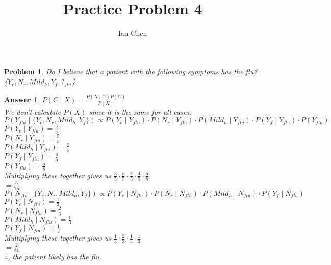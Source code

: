 \documentclass[11pt]{article}
\author{Ian Chen}
\title{Practice Problem 4}
\theoremstyle{description}
\newtheorem{problem}{Problem}
\theoremstyle{break}
\newtheorem*{answer}{Answer}
\begin{document}
    \maketitle

    \begin{problem}
        Do I believe that a patient with the following symptoms has the flu?\\
        \{$Y_c, N_r, Mild_h, Y_f, ?_{flu}$\}
    \end{problem}
    \begin{answer}
        $P(C\mid X) = \frac{P(X \mid C)P(C)}{P(X)}$\\
        We don't calculate $P(X)$ since it is the same for all cases.\\
        $P(Y_{flu} \mid \{Y_c, N_r, Mild_h, Y_f\}) \propto P(Y_c \mid Y_{flu})
        \cdot P(N_r \mid Y_{flu}) \cdot P(Mild_h \mid Y_{flu}) \cdot P(Y_f \mid Y_{flu})
        \cdot P(Y_{flu})$\\
        $P(Y_c \mid Y_{flu}) = \frac{3}{5}$\\
        $P(N_r \mid Y_{flu}) = \frac{5}{5}$\\
        $P(Mild_h \mid Y_{flu}) = \frac{2}{5}$\\
        $P(Y_f \mid Y_{flu}) = \frac{4}{5}$\\
        $P(Y_{flu}) = \frac{5}{8}$\\
        Multiplying these together gives us $\frac{3}{5} \cdot \frac{5}{5} \cdot
        \frac{2}{5} \cdot \frac{4}{5} \cdot \frac{5}{8}$\\
        $= \frac{3}{25}$\\
        $P(N_{flu} \mid \{Y_c, N_r, Mild_h, Y_f\}) \propto P(Y_c \mid N_{flu}) \cdot
        P(N_r \mid N_{flu}) \cdot P(Mild_h \mid N_{flu}) \cdot P(Y_f \mid N_{flu})$\\
        $P(Y_c \mid N_{flu}) = \frac{1}{3}$\\
        $P(N_r \mid N_{flu}) = \frac{2}{3}$\\
        $P(Mild_h \mid N_{flu}) = \frac{1}{3}$\\
        $P(Y_f \mid N_{flu}) = \frac{1}{3}$\\
        Multiplying these together gives us $\frac{1}{3} \cdot \frac{2}{3} \cdot
        \frac{1}{3} \cdot \frac{1}{3}$\\
        $= \frac{2}{81}$\\
        $\therefore$, the patient likely has the flu.
    \end{answer}
\end{document}
